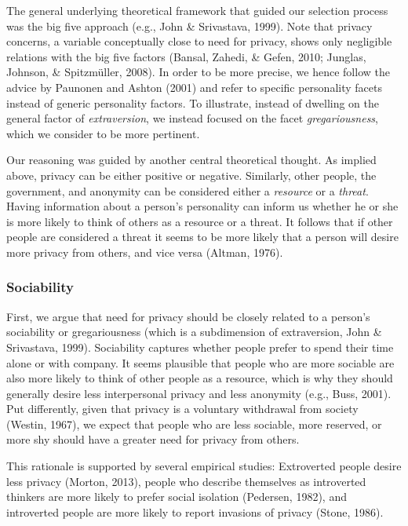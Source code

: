 \documentclass[man,floatsintext]{apa6}
\begin{document}
The general underlying theoretical framework that guided our selection process was the big five approach (e.g., John \& Srivastava, 1999). Note that privacy concerns, a variable conceptually close to need for privacy, shows only negligible relations with the big five factors (Bansal, Zahedi, \& Gefen, 2010; Junglas, Johnson, \& Spitzmüller, 2008). In order to be more precise, we hence follow the advice by Paunonen and Ashton (2001) and refer to specific personality facets instead of generic personality factors. To illustrate, instead of dwelling on the general factor of \emph{extraversion}, we instead focused on the facet \emph{gregariousness}, which we consider to be more pertinent.

Our reasoning was guided by another central theoretical thought. As implied above, privacy can be either positive or negative. Similarly, other people, the government, and anonymity can be considered either a \emph{resource} or a \emph{threat}. Having information about a person's personality can inform us whether he or she is more likely to think of others as a resource or a threat. It follows that if other people are considered a threat it seems to be more likely that a person will desire more privacy from others, and vice versa (Altman, 1976).

\hypertarget{sociability}{%
\subsubsection{Sociability}\label{sociability}}

First, we argue that need for privacy should be closely related to a person's sociability or gregariousness (which is a subdimension of extraversion, John \& Srivastava, 1999). Sociability captures whether people prefer to spend their time alone or with company. It seems plausible that people who are more sociable are also more likely to think of other people as a resource, which is why they should generally desire less interpersonal privacy and less anonymity (e.g., Buss, 2001). Put differently, given that privacy is a voluntary withdrawal from society (Westin, 1967), we expect that people who are less sociable, more reserved, or more shy should have a greater need for privacy from others.

This rationale is supported by several empirical studies: Extroverted people desire less privacy (Morton, 2013), people who describe themselves as introverted thinkers are more likely to prefer social isolation (Pedersen, 1982), and introverted people are more likely to report invasions of privacy (Stone, 1986).
\end{document}
